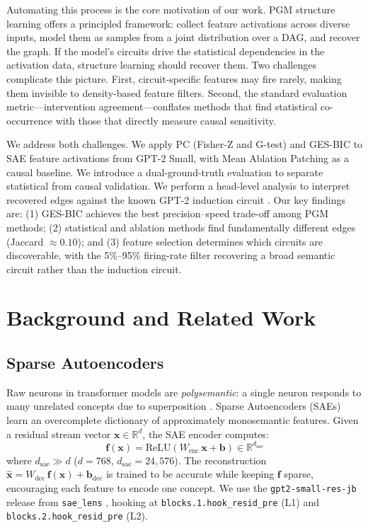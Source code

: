 \documentclass{article}
\begin{document}
Automating this process is the core motivation of our work. PGM structure
learning offers a principled framework: collect feature activations across
diverse inputs, model them as samples from a joint distribution over a DAG,
and recover the graph. If the model's circuits drive the statistical
dependencies in the activation data, structure learning should recover them.
Two challenges complicate this picture. First, circuit-specific features may
fire rarely, making them invisible to density-based feature filters. Second,
the standard evaluation metric---intervention agreement---conflates methods
that find statistical co-occurrence with those that directly measure causal
sensitivity.

We address both challenges. We apply PC (Fisher-Z and G-test) and GES-BIC to
SAE feature activations from GPT-2 Small, with Mean Ablation Patching as a
causal baseline. We introduce a dual-ground-truth evaluation to separate
statistical from causal validation. We perform a head-level analysis to
interpret recovered edges against the known GPT-2 induction circuit
\citep{olsson2022induction}. Our key findings are: (1) GES-BIC achieves the
best precision--speed trade-off among PGM methods; (2) statistical and
ablation methods find fundamentally different edges (Jaccard $\approx 0.10$);
and (3) feature selection determines which circuits are discoverable, with the
5\%--95\% firing-rate filter recovering a broad semantic circuit rather than
the induction circuit.

\section{Background and Related Work}

\subsection{Sparse Autoencoders}

Raw neurons in transformer models are \emph{polysemantic}: a single neuron
responds to many unrelated concepts due to superposition
\citep{elhage2022superposition}. Sparse Autoencoders (SAEs) learn an
overcomplete dictionary of approximately monosemantic features. Given a residual
stream vector $\mathbf{x} \in \mathbb{R}^{d}$, the SAE encoder computes:
\[
  \mathbf{f}(\mathbf{x}) = \text{ReLU}(W_{\text{enc}}\,\mathbf{x} + \mathbf{b})
  \in \mathbb{R}^{d_{\text{sae}}}
\]
where $d_{\text{sae}} \gg d$ ($d{=}768$, $d_{\text{sae}}{=}24{,}576$).
The reconstruction $\hat{\mathbf{x}} = W_{\text{dec}}\,\mathbf{f}(\mathbf{x}) + \mathbf{b}_{\text{dec}}$
is trained to be accurate while keeping $\mathbf{f}$ sparse, encouraging each
feature to encode one concept. We use the \texttt{gpt2-small-res-jb} release
from \texttt{sae\_lens} \citep{bloom2024saelens}, hooking at
\texttt{blocks.1.hook\_resid\_pre} (L1) and \texttt{blocks.2.hook\_resid\_pre} (L2).
\end{document}
